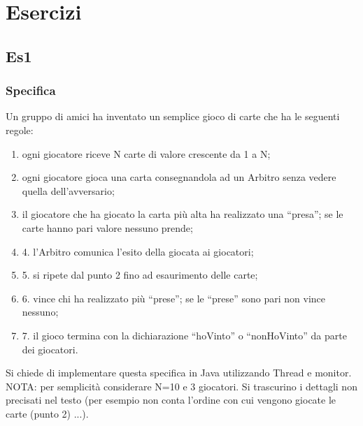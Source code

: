 \chapter{Esercizi}
\section{Es1}
\subsection{Specifica}
Un gruppo di amici ha inventato un semplice gioco di carte che ha le seguenti regole:
\begin{enumerate}
    \item ogni giocatore riceve N carte di valore crescente da 1 a N;
    \item ogni giocatore gioca una carta consegnandola ad un Arbitro senza vedere quella dell'avversario;
    \item il giocatore che ha giocato la carta più alta ha realizzato una “presa”; se le carte hanno pari valore nessuno prende;
    \item 4. l'Arbitro comunica l'esito della giocata ai giocatori;
    \item 5. si ripete dal punto 2 fino ad esaurimento delle carte;
    \item 6. vince chi ha realizzato più “prese”; se le “prese” sono pari non vince nessuno;
    \item 7. il gioco termina con la dichiarazione “hoVinto” o “nonHoVinto” da parte dei giocatori.
\end{enumerate}
Si chiede di implementare questa specifica in Java utilizzando Thread e monitor.
\\NOTA: per semplicità considerare N=10 e 3 giocatori. Si trascurino i dettagli non precisati nel testo (per esempio non conta l'ordine con cui vengono giocate le carte (punto 2) ...).

